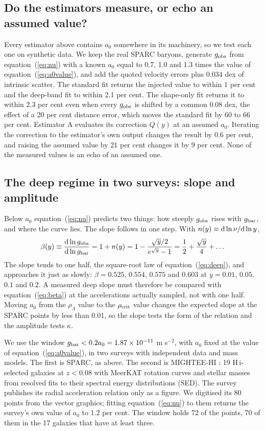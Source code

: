 \documentclass[fleqn,usenatbib]{mnras}
\begin{document}
\subsection{Do the estimators measure, or echo an assumed value?}
\label{sec:injection}
Every estimator above contains $a_0$ somewhere in its machinery, so we test each one on synthetic data. We keep the real SPARC baryons, generate $g_{\rm obs}$ from equation~(\ref{eq:nu}) with a known $a_0$ equal to 0.7, 1.0 and 1.3 times the value of equation~(\ref{eq:a0value}), and add the quoted velocity errors plus 0.034 dex of intrinsic scatter. The standard fit returns the injected value to within 1 per cent and the deep-band fit to within 2.1 per cent. The shape-only fit returns it to within 2.3 per cent even when every $g_{\rm obs}$ is shifted by a common 0.08 dex, the effect of a 20 per cent distance error, which moves the standard fit by 60 to 66 per cent. Estimator A evaluates its correction $Q(y)$ at an assumed $a_0$. Iterating the correction to the estimator's own output changes the result by 0.6 per cent, and raising the assumed value by 21 per cent changes it by 9 per cent. None of the measured values is an echo of an assumed one.

\subsection{The deep regime in two surveys: slope and amplitude}
\label{sec:deepregime}
Below $a_0$ equation~(\ref{eq:nu}) predicts two things: how steeply $g_{\rm obs}$ rises with $g_{\rm bar}$, and where the curve lies. The slope follows in one step. With $n(y)\equiv{\rm d}\ln\nu/{\rm d}\ln y$,
\begin{equation}
\beta(y)\equiv\frac{{\rm d}\ln g_{\rm obs}}{{\rm d}\ln g_{\rm bar}}=1+n(y)=1-\frac{\sqrt y/2}{e^{\sqrt y}-1}=\frac12+\frac{\sqrt y}{4}+\ldots
\label{eq:beta}
\end{equation}
The slope tends to one half, the square-root law of equation~(\ref{eq:deep}), and approaches it just as slowly: $\beta=0.525$, $0.554$, $0.575$ and $0.603$ at $y=0.01$, $0.05$, $0.1$ and $0.2$. A measured deep slope must therefore be compared with equation~(\ref{eq:beta}) at the accelerations actually sampled, not with one half. Moving $a_0$ from the $\rho_\Lambda$ value to the $\rho_{\rm crit}$ value changes the expected slope at the SPARC points by less than 0.01, so the slope tests the form of the relation and the amplitude tests $\kappa$.

We use the window $g_{\rm bar}<0.2a_0=1.87\times10^{-11}$ m s$^{-2}$, with $a_0$ fixed at the value of equation~(\ref{eq:a0value}), in two surveys with independent data and mass models. The first is SPARC, as above. The second is MIGHTEE-HI \citep{Varasteanu2025}: 19 H\,{\sc i}-selected galaxies at $z<0.08$ with MeerKAT rotation curves and stellar masses from resolved fits to their spectral energy distributions (SED). The survey publishes its radial acceleration relation only as a figure. We digitised its 80 points from the vector graphics; fitting equation~(\ref{eq:nu}) to them returns the survey's own value of $a_0$ to 1.2 per cent. The window holds 72 of the points, 70 of them in the 17 galaxies that have at least three.
\end{document}
